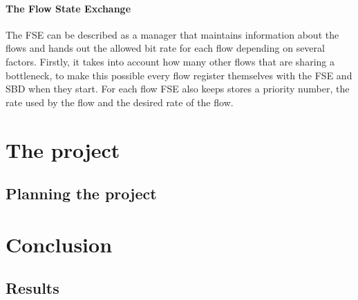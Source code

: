 \documentclass[UKenglish]{ifimaster}  %
\begin{document}
\subsection{The Flow State Exchange}
The FSE can be described as a manager that maintains information about the flows and hands out the allowed bit rate for each flow depending on several factors. 
Firstly, it takes into account how many other flows that are sharing a bottleneck, to make this possible every flow register themselves with the FSE and SBD when they start. 
For each flow FSE also keeps stores a priority number, the rate used by the flow and the desired rate of the flow. 
\part{The project}                 
\chapter{Planning the project}      
\part{Conclusion}                    
\chapter{Results}                     
\backmatter{}
\printbibliography
\end{document}
